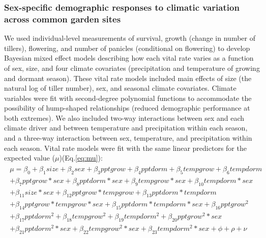 \documentclass[12pt]{article}\usepackage[]{graphicx}\usepackage[dvipsnames]{xcolor}
\newcommand{\tom}[2]{{\color{red}{#1}}\footnote{\textit{\color{red}{#2}}}}
\begin{document}
\subsubsection*{Sex-specific demographic responses to climatic variation across common garden sites}
We used individual-level measurements of survival, growth (change in number of tillers), flowering, and number of panicles (conditional on flowering) to develop Bayesian mixed effect models describing how each vital rate varies as a function of sex, size, and four climate covariates (precipitation and temperature of growing and dormant season). 
These vital rate models included main effects of size (the natural log of tiller number), sex, and seasonal climate covariates. 
Climate variables were fit with second-degree polynomial functions to accommodate the possibility of hump-shaped relationships (reduced demographic performance at both extremes).
We also included two-way interactions between sex and each climate driver and between temperature and precipitation within each season, and a three-way interaction between sex, temperature, and precipitation within each season. 
Vital rate models were fit with the same linear predictors for the expected value ($\mu$)(Eq.\ref{eq:mu}):
\begin{align}\label{eq:mu}
\begin{split}
\mu = \beta_{0} + \beta_{1}size + \beta_{2}sex + \beta_{3}pptgrow + \beta_{4}pptdorm + \beta_{5}tempgrow + \beta_{6}tempdorm \\ 
+ \beta_{7}pptgrow*sex + \beta_{8}pptdorm*sex + \beta_{9}tempgrow*sex + \beta_{10}tempdorm*sex  \\ 
+  \beta_{11}size*sex + \beta_{12}pptgrow*tempgrow + \beta_{13}pptdorm*tempdorm\\
+ \beta_{14}pptgrow*tempgrow*sex + \beta_{15}pptdorm*tempdorm*sex + \beta_{16}pptgrow^2\\
+ \beta_{17}pptdorm^2 + \beta_{18}tempgrow^2 + \beta_{19}tempdorm^2 + \beta_{20}pptgrow^2*sex  \\
+ \beta_{21}pptdorm^2*sex + \beta_{22}tempgrow^2*sex + \beta_{23}tempdorm^2*sex + \phi + \rho + \nu 
\end{split}
\end{align}
\end{document}
